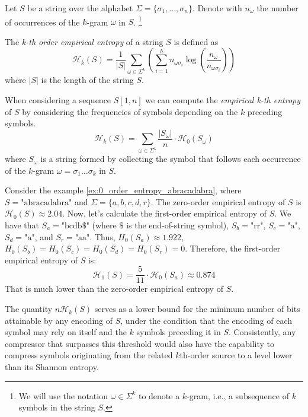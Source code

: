 \noindent Let $S$ be a string over the alphabet $\Sigma=\{\sigma_1, \dots, \sigma_n\}$. Denote with $n_\omega$ the number of occurrences of the $k$-gram $\omega$ in $S$. \footnote{We will use the notation $\omega \in \Sigma^k$ to denote a $k$-gram, i.e., a subsequence of $k$ symbols in the string $S$.}

\begin{definition} \label{def:kth_order_empirical_entropy}
    The \emph{k-th order empirical entropy} of a string $S$ is defined as
    \begin{equation}
        \mathcal{H}_k(S) = \frac{1}{|S|} \sum_{\omega \in \Sigma^k} \left ( \sum_{i=1}^h n_{\omega\sigma_i} \log \left ( \frac{n_\omega}{n_{\omega\sigma_i}} \right) \right )
    \end{equation}
    where $|S|$ is the length of the string $S$.
\end{definition}

\noindent When considering a sequence $S[1,n]$ we can compute the \emph{empirical k-th entropy} of $S$ by considering the frequencies of symbols depending on the $k$ preceding symbols.
\begin{equation}
    \mathcal{H}_k(S) = \sum_{\omega \in \Sigma^k} \frac{|S_\omega|}{n} \cdot \mathcal{H_0}(S_\omega)
\end{equation}
where $S_\omega$ is a string formed by collecting the symbol that follows each occurrence of the $k$-gram $\omega = \sigma_1 \dots \sigma_k$ in $S$.

\begin{example}
    Consider the example \ref{ex:0_order_entropy_abracadabra}, where $S = \text{"abracadabra"}$ and $\Sigma = \{a, b, c, d, r\}$. The zero-order empirical entropy of $S$ is $\mathcal{H}_0(S) \approx 2.04$. Now, let's calculate the first-order empirical entropy of $S$. We have that $S_a = \text{"bcdb\$"}$ (where $\$$ is the end-of-string symbol), $S_b = \text{"rr"}$, $S_c = \text{"a"}$, $S_d = \text{"a"}$, and $S_r = \text{"aa"}$. Thus, $H_0(S_a) \approx 1.922$, $H_0(S_b) = H_0(S_c) = H_0(S_d) = H_0(S_r) = 0$. Therefore, the first-order empirical entropy of $S$ is:
    \[
        \mathcal{H}_1(S) = \frac{5}{11} \cdot \mathcal{H}_0(S_a) \approx 0.874
    \]
    That is much lower than the zero-order empirical entropy of $S$.
\end{example}

\noindent The quantity $n \mathcal{H}_k(S)$ serves as a lower bound for the minimum number of bits attainable by any encoding of $S$, under the condition that the encoding of each symbol may rely on itself and the $k$ symbols preceding it in $S$. Consistently, any compressor that surpasses this threshold would also have the capability to compress symbols originating from the related $k$th-order source to a level lower than its Shannon entropy.

